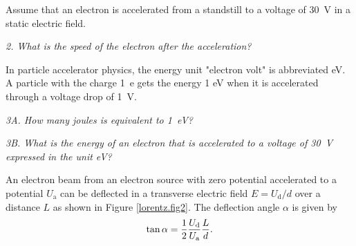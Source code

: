 \documentclass[../Elmag-labhefte-2020.tex]{subfiles}
\begin{document}
Assume that an electron is accelerated from a standstill to a voltage of \SI{30}{\volt} in a static electric field.

\emph{ 2. What is the speed of the electron after the acceleration? }

In particle accelerator physics, the energy unit "electron volt" is abbreviated \si{\eV}. A particle with the charge \SI{1}{e} gets the energy 1 eV when it is accelerated through a voltage drop of \SI{1}{\volt}.

\emph{ 3A. How many joules is equivalent to \SI{1}{\eV}? }

\emph{ 3B. What is the energy of an electron that is accelerated to a voltage of \SI{30}{\volt} expressed in the unit \si{\eV}?}
 
An electron beam from an electron source with zero potential accelerated to a potential $U_\mathrm{a}$ can be deflected in a transverse electric field $E = U_\mathrm{d} /d$ over a distance $L$ as shown in Figure \ref{lorentz.fig2}. The deflection angle $\alpha$ is given by
\begin{equation}
    \tan \alpha = \frac{1}{2} \frac{U_\mathrm{d}}{U_\mathrm{a}}  \frac{L}{d} .
    \label{eq:lorentz.5}
\end{equation}
\end{document}
